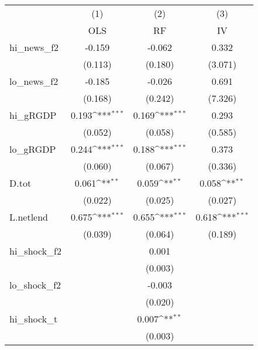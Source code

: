 {
\def\sym#1{\ifmmode^{#1}\else\(^{#1}\)\fi}
\begin{tabular}{l*{3}{c}}
\toprule
            &\multicolumn{1}{c}{(1)}&\multicolumn{1}{c}{(2)}&\multicolumn{1}{c}{(3)}\\
            &\multicolumn{1}{c}{OLS}&\multicolumn{1}{c}{RF}&\multicolumn{1}{c}{IV}\\
\midrule
hi\_news\_f2  &      -0.159         &      -0.062         &       0.332         \\
            &     (0.113)         &     (0.180)         &     (3.071)         \\
\addlinespace
lo\_news\_f2  &      -0.185         &      -0.026         &       0.691         \\
            &     (0.168)         &     (0.242)         &     (7.326)         \\
\addlinespace
hi\_gRGDP    &       0.193\sym{***}&       0.169\sym{***}&       0.293         \\
            &     (0.052)         &     (0.058)         &     (0.585)         \\
\addlinespace
lo\_gRGDP    &       0.244\sym{***}&       0.188\sym{***}&       0.373         \\
            &     (0.060)         &     (0.067)         &     (0.336)         \\
\addlinespace
D.tot       &       0.061\sym{**} &       0.059\sym{**} &       0.058\sym{**} \\
            &     (0.022)         &     (0.025)         &     (0.027)         \\
\addlinespace
L.netlend   &       0.675\sym{***}&       0.655\sym{***}&       0.618\sym{***}\\
            &     (0.039)         &     (0.064)         &     (0.189)         \\
\addlinespace
hi\_shock\_f2 &                     &       0.001         &                     \\
            &                     &     (0.003)         &                     \\
\addlinespace
lo\_shock\_f2 &                     &      -0.003         &                     \\
            &                     &     (0.020)         &                     \\
\addlinespace
hi\_shock\_t  &                     &       0.007\sym{**} &                     \\
            &                     &     (0.003)         &                     \\

\end{tabular}}
